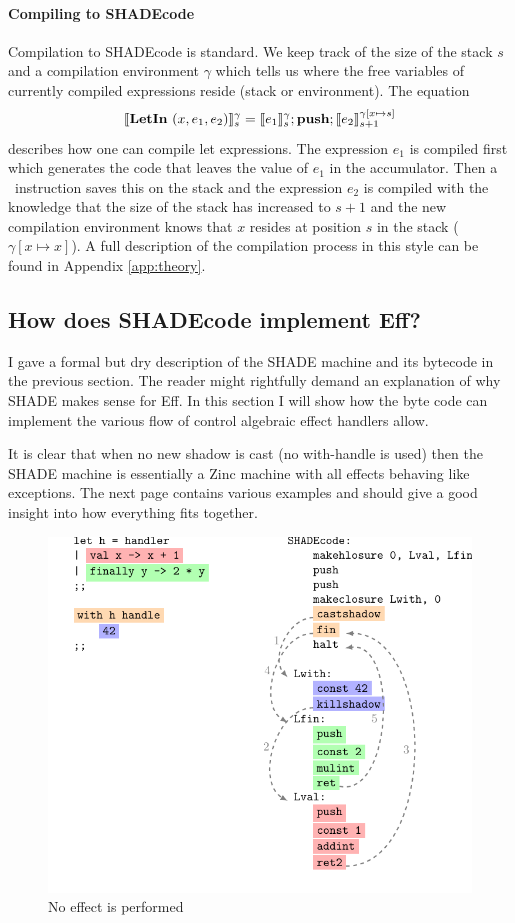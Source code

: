 \documentclass[class=article, crop=false]{standalone}
\begin{document}
\paragraph{Compiling to SHADEcode}

Compilation to SHADEcode is standard. We keep track of the size of the stack
$s$ and a compilation environment $\gamma$ which tells us where the free
variables of currently compiled expressions reside (stack or environment).
The equation
$$ \llbracket \mathbf{LetIn}\ (x, e_1, e_2) \rrbracket_s^\gamma = \llbracket e_1 \rrbracket_s^\gamma; \textbf{push}; \llbracket e_2 \rrbracket_{s+1}^{\gamma[x \mapsto s]} $$
describes how one can compile let expressions. The expression $e_1$ is compiled
first which generates the code that leaves the value of $e_1$ in the accumulator.
Then a \vmPush\ instruction saves this on the stack and the expression $e_2$ is
compiled with the knowledge that the size of the stack has increased to $s+1$
and the new compilation environment knows that $x$ resides at position $s$ in
the stack ($\gamma[x \mapsto x]$). A full description of the compilation process
in this style can be found in Appendix \autoref{app:theory}.

\subsection{How does SHADEcode implement Eff?}
\label{sec:shade-illustration}

I gave a formal but dry description of the SHADE machine and its bytecode in
the previous section. The reader might rightfully demand an explanation of why
SHADE makes sense for Eff. In this section I will show how the byte code can
implement the various flow of control algebraic effect handlers allow.

It is clear that when no new shadow is cast (no with-handle is used) then the
SHADE machine is essentially a Zinc \cite{leroy1990zinc} machine with all
effects behaving like exceptions. The next page contains various examples and
should give a good insight into how everything fits together.

\begin{figure}[htb]
    \centering
    \includegraphics[width=.8\linewidth]{../figures/impl-no-perform.pdf}

    \caption{No effect is performed}
    \label{fig:shadecode-no-effect}
\end{figure}
\end{document}
